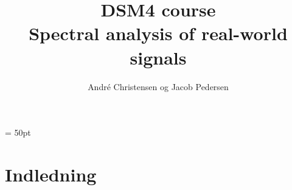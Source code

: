 \documentclass[a4paper,12pt]{article}
\begin{document}
\title{DSM4 course\\Spectral analysis of real-world signals\\}
\author{André Christensen og Jacob Pedersen}

\maketitle





\newpage
\headheight = 50pt


\tableofcontents
\newpage

\section{Indledning}
\end{document}
